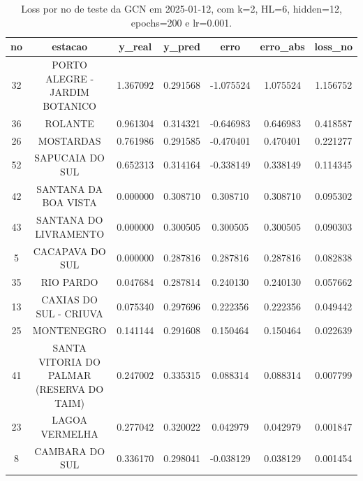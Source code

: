 \begin{table}[h]
\centering
\caption{Loss por no de teste da GCN em 2025-01-12, com k=2, HL=6, hidden=12, epochs=200 e lr=0.001.}
\label{tab:gcn_loss_k2_hl6_h12_e200_d20250112}
\begin{tabular}{ccccccc}
\toprule
no & estacao & y\_real & y\_pred & erro & erro\_abs & loss\_no \\
\midrule
32 & PORTO ALEGRE - JARDIM BOTANICO & 1.367092 & 0.291568 & -1.075524 & 1.075524 & 1.156752 \\
36 & ROLANTE & 0.961304 & 0.314321 & -0.646983 & 0.646983 & 0.418587 \\
26 & MOSTARDAS & 0.761986 & 0.291585 & -0.470401 & 0.470401 & 0.221277 \\
52 & SAPUCAIA DO SUL & 0.652313 & 0.314164 & -0.338149 & 0.338149 & 0.114345 \\
42 & SANTANA DA BOA VISTA & 0.000000 & 0.308710 & 0.308710 & 0.308710 & 0.095302 \\
43 & SANTANA DO LIVRAMENTO & 0.000000 & 0.300505 & 0.300505 & 0.300505 & 0.090303 \\
5 & CACAPAVA DO SUL & 0.000000 & 0.287816 & 0.287816 & 0.287816 & 0.082838 \\
35 & RIO PARDO & 0.047684 & 0.287814 & 0.240130 & 0.240130 & 0.057662 \\
13 & CAXIAS DO SUL - CRIUVA & 0.075340 & 0.297696 & 0.222356 & 0.222356 & 0.049442 \\
25 & MONTENEGRO & 0.141144 & 0.291608 & 0.150464 & 0.150464 & 0.022639 \\
41 & SANTA VITORIA DO PALMAR (RESERVA DO TAIM) & 0.247002 & 0.335315 & 0.088314 & 0.088314 & 0.007799 \\
23 & LAGOA VERMELHA & 0.277042 & 0.320022 & 0.042979 & 0.042979 & 0.001847 \\
8 & CAMBARA DO SUL & 0.336170 & 0.298041 & -0.038129 & 0.038129 & 0.001454 \\
\bottomrule
\end{tabular}
\end{table}
